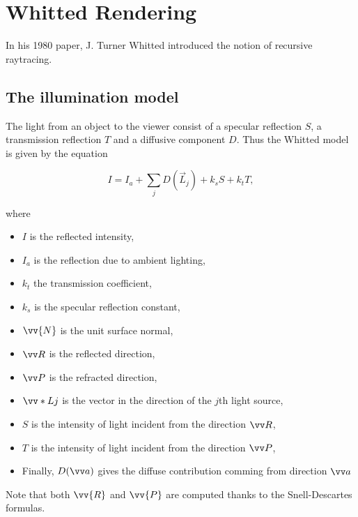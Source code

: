 
\section{Whitted Rendering}
In his 1980 paper\cite{whitted_improved_1980}, J. Turner Whitted
introduced the notion of recursive raytracing.

\subsection{The illumination model}
The light from an object to the viewer consist of a specular reflection \(S\),
a transmission reflection \(T\) and a diffusive component \(D\).
Thus the Whitted model is given by the equation

\begin{equation}
    \label{eq:whitted_model}
    I = I_a + \sum_j D(\vec L_j) + k_sS + k_t T,
\end{equation}


where
\begin{itemize}
    \item \(I\) is the reflected intensity,
    \item \(I_a\) is the reflection due to ambient lighting,
    \item \(k_t\) the transmission coefficient,
    \item \(k_s\) is the specular reflection constant,
    \item \(\vv{N}\) is the unit surface normal,
    \item \(\vv R\) is the reflected direction,
    \item \(\vv P\) is the refracted direction,
    \item \(\vv*{L}{j}\) is the vector in the direction of the \(j\)th light source,
    \item \(S\) is the intensity of light incident from the direction \(\vv R\),
    \item \(T\) is the intensity of light incident from the direction \(\vv P\),
    \item Finally, \(D(\vv a)\) gives the diffuse contribution comming from direction \(\vv a\)
\end{itemize}

Note that both \(\vv{R}\) and \(\vv{P}\) are computed thanks to the Snell-Descartes formulas.

\begin{center}

\end{center}


